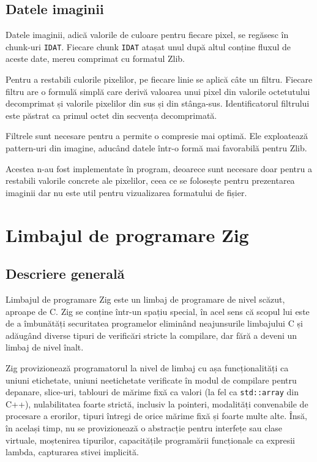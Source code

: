 \documentclass[a4paper,12pt]{report}
\begin{document}
\subsection{Datele imaginii}

Datele imaginii, adică valorile de culoare pentru fiecare pixel, se regăsesc în chunk-uri \texttt{IDAT}.
Fiecare chunk \texttt{IDAT} atașat unul după altul conține fluxul de aceste date, mereu comprimat cu formatul Zlib.

Pentru a restabili culorile pixelilor, pe fiecare linie se aplică câte un filtru.
Fiecare filtru are o formulă simplă care derivă valoarea unui pixel
din valorile octetutului decomprimat și valorile pixelilor din sus și din stânga-sus.
Identificatorul filtrului este păstrat ca primul octet din secvența decomprimată. 

Filtrele sunt necesare pentru a permite o compresie mai optimă.
Ele exploatează pattern-uri din imagine, aducând datele într-o formă mai favorabilă pentru Zlib.

Acestea n-au fost implementate în program, deoarece sunt necesare
doar pentru a restabili valorile concrete ale pixelilor,
ceea ce se folosește pentru prezentarea imaginii dar nu este util pentru vizualizarea formatului de fișier.


\section{Limbajul de programare Zig}

\subsection{Descriere generală}

Limbajul de programare Zig este un limbaj de programare de nivel scăzut, aproape de C.
Zig se conține într-un spațiu special, în acel sens că scopul lui este de
a îmbunătăți securitatea programelor eliminând neajunsurile limbajului C
și adăugând diverse tipuri de verificări stricte la compilare,
dar fără a deveni un limbaj de nivel înalt.

Zig provizionează programatorul la nivel de limbaj cu așa funcționalități ca 
uniuni etichetate, uniuni neetichetate verificate în modul de compilare pentru depanare,
slice-uri, tablouri de mărime fixă ca valori (la fel ca \texttt{std::array} din C++),
nulabilitatea foarte strictă, inclusiv la pointeri, modalități convenabile de procesare a erorilor,
tipuri întregi de orice mărime fixă și foarte multe alte.
Însă, în același timp, nu se provizionează o abstracție pentru interfețe sau clase virtuale,
moștenirea tipurilor, capacitățile programării funcționale ca expresii lambda,
capturarea stivei implicită.
\end{document}
